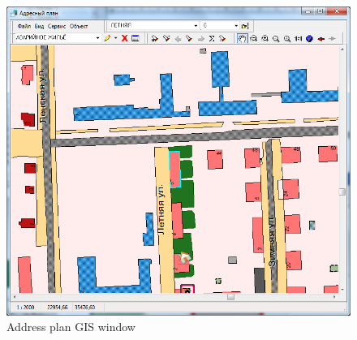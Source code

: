 \documentclass[conference]{IEEEtran}
\begin{document}
\begin{figure}[bt]
  \centering
  \includegraphics[width=\linewidth]{addressplan.png}
  \caption{Address plan GIS window}
  \label{fig:addrplan}
\end{figure}


%
%



%
%
\end{document}
